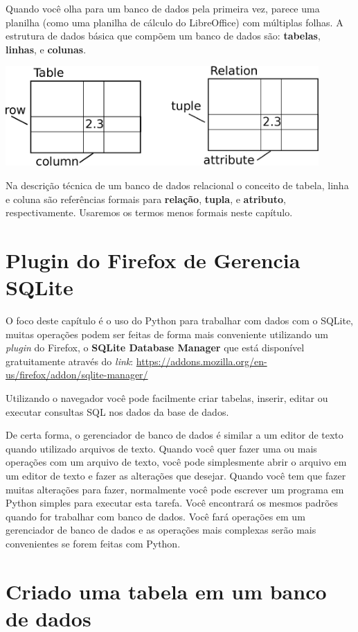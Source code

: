 Quando você olha para um banco de dados pela primeira vez, parece uma planilha
(como uma planilha de cálculo do LibreOffice) com múltiplas folhas. A
estrutura de dados básica que compõem um banco de dados são:
{\bf tabelas}, {\bf linhas}, e {\bf colunas}.

\beforefig
\centerline{\includegraphics[height=1.50in]{figs2/relational.eps}}
\afterfig

Na descrição técnica de um banco de dados relacional o conceito de
tabela, linha e coluna são referências formais para {\bf relação},
{\bf tupla}, e {\bf atributo}, respectivamente.
Usaremos os termos menos formais neste capítulo.

\section{Plugin do Firefox de Gerencia SQLite}

O foco deste capítulo é o uso do Python para trabalhar com dados
com o SQLite, muitas operações podem ser feitas de forma mais
conveniente utilizando um {\it plugin} do Firefox, o {\bf SQLite
Database Manager} que está disponível gratuitamente através do {\it link}:
\url{https://addons.mozilla.org/en-us/firefox/addon/sqlite-manager/}

Utilizando o navegador você pode facilmente criar tabelas, inserir, editar ou
executar consultas SQL nos dados da base de dados.

De certa forma, o gerenciador de banco de dados é similar a um editor de texto
quando utilizado arquivos de texto. Quando você quer fazer uma ou mais
operações com um arquivo de texto, você pode simplesmente abrir o arquivo em
um editor de texto e fazer as alterações que desejar. Quando você tem que fazer
muitas alterações para fazer, normalmente você pode escrever um programa em
Python simples para executar esta tarefa. Você encontrará os mesmos padrões
quando for trabalhar com banco de dados. Você fará operações em um gerenciador
de banco de dados e as operações mais complexas serão mais convenientes se
forem feitas com Python.

\section{Criado uma tabela em um banco de dados}

